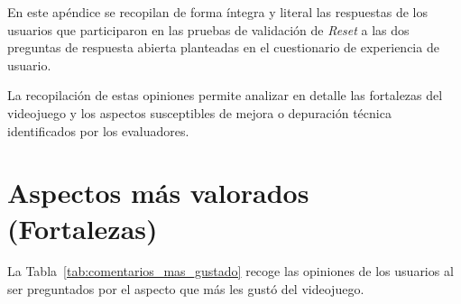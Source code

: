 En este apéndice se recopilan de forma íntegra y literal las respuestas de los usuarios que participaron en las pruebas de validación de \textit{Reset} a las dos preguntas de respuesta abierta planteadas en el cuestionario de experiencia de usuario. 

La recopilación de estas opiniones permite analizar en detalle las fortalezas del videojuego y los aspectos susceptibles de mejora o depuración técnica identificados por los evaluadores.

\section{Aspectos más valorados (Fortalezas)}
La Tabla~\ref{tab:comentarios_mas_gustado} recoge las opiniones de los usuarios al ser preguntados por el aspecto que más les gustó del videojuego.

